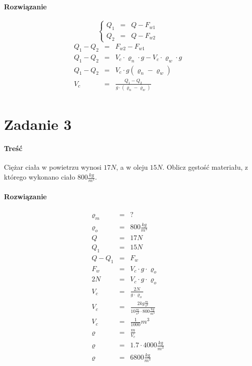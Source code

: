 \documentclass [a4paper, 11pt, oneside]{book}
\begin{document}
		\paragraph{Rozwiązanie}
		\[
			\left\{\begin{array}{ccc}
				Q_1 &=& Q-F_{w1}\\
				Q_2 &=& Q-F_{w2}
			\end{array}\right.
		\]
		\begin{eqnarray*}
			Q_1-Q_2 &=& F_{w2} - F_{w1}\\
			Q_1-Q_2 &=& V_c\cdot\varrho_n\cdot g-V_c\cdot\varrho_w\cdot g\\
			Q_1-Q_2 &=& V_c\cdot g(\varrho_n-\varrho_w)\\
			V_c &=& \frac{Q_1-Q_2}{g\cdot(\varrho_n-\varrho_w)}\\
		\end{eqnarray*}
	\section{Zadanie 3} %
	\label{sec:zadanie_3}
		\paragraph{Treść}Ciężar ciała w powietrzu wynosi $17N$, a w oleju $15N$. Oblicz gęstość materiału, z którego wykonano ciało $800\frac{kg}{m^3}$.
		\paragraph{Rozwiązanie}
		\begin{eqnarray*}
			\varrho_m &=& ?\\
			\varrho_o &=& 800\frac{kg}{m^3}\\
			Q &=& 17N\\
			Q_1 &=& 15N\\
			Q-Q_1 &=& F_w\\
			F_w &=& V_c\cdot g\cdot \varrho_o\\
			2N &=& V_c\cdot g\cdot \varrho_o\\
			V_c &=& \frac{2N}{g\cdot \varrho_o}\\
			V_c &=& \frac{2kg\frac{m}{s^2}}{10\frac{m}{s^2}\cdot800\frac{kg}{m^3}}\\
			V_c &=& \frac1{1000}m^3\\
			\varrho &=& \frac{m}{V_c}\\
			\varrho &=& 1.7\cdot4000\frac{kg}{m^3}\\
			\varrho &=& 6800 \frac{kg}{m^3}
		\end{eqnarray*}
\end{document}
